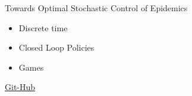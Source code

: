 \begin{frame}{Towards Optimal Stochastic Control of Epidemics}
    \begin{Huge}
        \begin{itemize}
            \item Discrete time
            \item Closed Loop Policies
            \item Games
        \end{itemize}
    \end{Huge}
\end{frame}
\begin{frame}
    \href{https://github.com/SaulDiazInfante/Beamer-ASU-Unison-Seiminar-on-StochasticModels.git}{Git-Hub}
    \flushright    
\end{frame}
